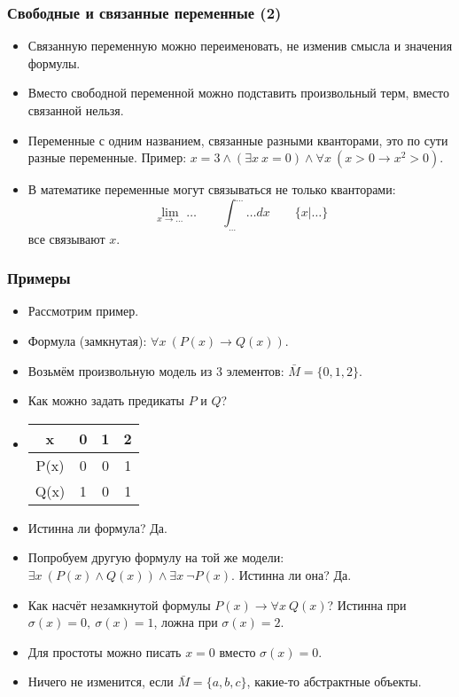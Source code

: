 \documentclass[10pt]{beamer}
\begin{document}
\begin{frame}
    \frametitle{Свободные и связанные переменные (2)}
    \begin{itemize}
        \item Связанную переменную можно переименовать, не изменив смысла и значения формулы.
        \item Вместо свободной переменной можно подставить произвольный терм, вместо связанной нельзя.
        \item Переменные с одним названием, связанные разными кванторами, это по сути разные переменные. Пример: $x = 3 \land (\exists x ~ x=0) \land \forall x ~ (x > 0 \to x^2 > 0)$.
        \item В математике переменные могут связываться не только кванторами: \pause
        \[ \lim_{x \to \ldots} \ldots \qquad \int_{\ldots}^{\ldots} \ldots dx \qquad \{x|\ldots\} \]
        все связывают $x$.
    \end{itemize}
\end{frame}

\begin{frame}
    \frametitle{Примеры}
    \begin{itemize}
        \item Рассмотрим пример.
        \item Формула (замкнутая): $\forall x ~ (P(x) \to Q(x))$.
        \item Возьмём произвольную модель из 3 элементов: $\bar{M} = \{0,1,2\}$.
        \item Как можно задать предикаты $P$ и $Q$? \pause
        \item[] \begin{tabular}{c | c c c}
            x & 0 & 1 & 2 \\ \hline
            P(x) & 0 & 0 & 1 \\
            Q(x) & 1 & 0 & 1
        \end{tabular}
        \item Истинна ли формула? \pause Да. \pause
        \item Попробуем другую формулу на той же модели:  $\exists x ~ (P(x) \land Q(x)) \land \exists x ~ \neg P(x)$. Истинна ли она? \pause Да. \pause
        \item Как насчёт незамкнутой формулы $P(x) \to \forall x ~ Q(x)$? \pause Истинна при $\sigma(x) = 0,~\sigma(x) = 1$, ложна при $\sigma(x) = 2$. \pause
        \item Для простоты можно писать $x = 0$ вместо $\sigma(x) = 0$. \pause
        \item Ничего не изменится, если $\bar{M} = \{a,b,c\}$, какие-то абстрактные объекты. 
    \end{itemize}
\end{frame}
\end{document}

